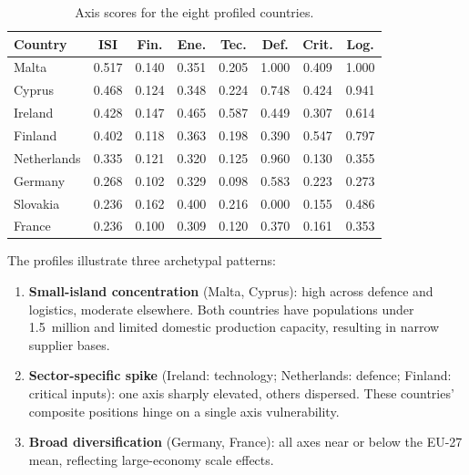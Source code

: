 \begin{table}[htbp]
\centering
\caption{Axis scores for the eight profiled countries.}
\label{tab:profile-comparison}
\small
\setlength{\tabcolsep}{4pt}
\begin{tabular*}{\textwidth}{@{\extracolsep{\fill}}
  l
  S[table-format=1.3,round-precision=3]
  S[table-format=1.3,round-precision=3]
  S[table-format=1.3,round-precision=3]
  S[table-format=1.3,round-precision=3]
  S[table-format=1.3,round-precision=3]
  S[table-format=1.3,round-precision=3]
  S[table-format=1.3,round-precision=3]
  @{}}
\toprule
\textbf{Country} & {\textbf{ISI}} & {\textbf{Fin.}} & {\textbf{Ene.}}
  & {\textbf{Tec.}} & {\textbf{Def.}} & {\textbf{Crit.}}
  & {\textbf{Log.}} \\
\midrule
Malta        & 0.517 & 0.140 & 0.351 & 0.205 & 1.000 & 0.409 & 1.000 \\
Cyprus       & 0.468 & 0.124 & 0.348 & 0.224 & 0.748 & 0.424 & 0.941 \\
Ireland      & 0.428 & 0.147 & 0.465 & 0.587 & 0.449 & 0.307 & 0.614 \\
Finland      & 0.402 & 0.118 & 0.363 & 0.198 & 0.390 & 0.547 & 0.797 \\
Netherlands  & 0.335 & 0.121 & 0.320 & 0.125 & 0.960 & 0.130 & 0.355 \\
Germany      & 0.268 & 0.102 & 0.329 & 0.098 & 0.583 & 0.223 & 0.273 \\
Slovakia     & 0.236 & 0.162 & 0.400 & 0.216 & 0.000 & 0.155 & 0.486 \\
France       & 0.236 & 0.100 & 0.309 & 0.120 & 0.370 & 0.161 & 0.353 \\
\bottomrule
\end{tabular*}
\end{table}

The profiles illustrate three archetypal patterns:
\begin{enumerate}[leftmargin=2em]
  \item \textbf{Small-island concentration} (Malta, Cyprus): high
    across defence and logistics, moderate elsewhere.  Both countries
    have populations under 1.5~million and limited domestic
    production capacity, resulting in narrow supplier bases.
  \item \textbf{Sector-specific spike} (Ireland: technology;
    Netherlands: defence; Finland: critical inputs): one axis sharply
    elevated, others dispersed.  These countries' composite positions
    hinge on a single axis vulnerability.
  \item \textbf{Broad diversification} (Germany, France): all axes
    near or below the EU-27 mean, reflecting large-economy scale
    effects.
\end{enumerate}

